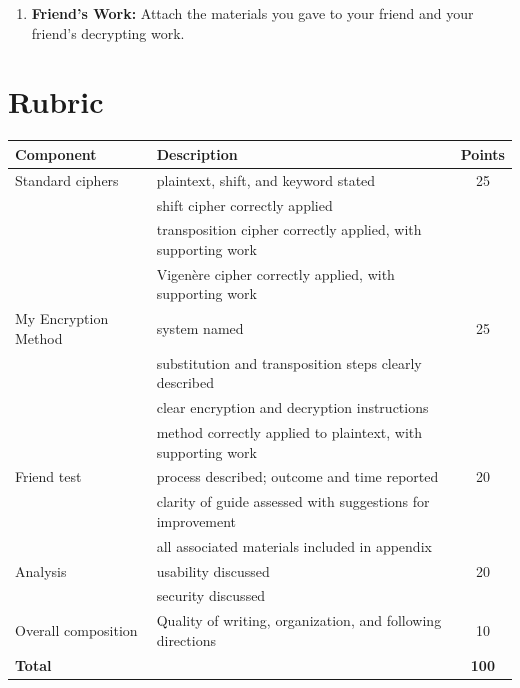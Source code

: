 \documentclass[11pt]{article}
\begin{document}
\begin{enumerate}[leftmargin=*, label=\(\square\)]
\hspace*{-.2in}\noindent\textbf{Appendix}
\vspace{-3pt}
  \item \textbf{Friend's Work:} Attach the materials you gave to your friend and your friend's decrypting work.

\end{enumerate}


\vspace{-4pt}
\section*{\normalsize Rubric}
\vspace{-4pt}\begin{center}
\renewcommand{\arraystretch}{1.3}
\begin{tabular}{l p{9cm} c}
\toprule
\textbf{Component} & \textbf{Description} & \textbf{Points} \\
\midrule
Standard ciphers & plaintext, shift, and keyword stated & 25 \\
& shift cipher correctly applied & \\
& transposition cipher correctly applied, with supporting work & \\
& Vigen\`{e}re cipher correctly applied, with supporting work & \\
\hline
My Encryption Method & system named & 25 \\
& substitution and transposition steps clearly described & \\
& clear encryption and decryption instructions & \\
& method correctly applied to plaintext, with supporting work & \\
\hline
Friend test & process described; outcome and time reported & 20 \\
& clarity of guide assessed with suggestions for improvement & \\
&all associated materials included in appendix&\\
\hline
Analysis & usability discussed & 20 \\
& security discussed& \\

\hline
Overall composition & Quality of writing, organization, and following directions & 10 \\
\midrule
\textbf{Total} & & \textbf{100} \\
\bottomrule
\end{tabular}
\end{center}

\newpage
\end{document}
